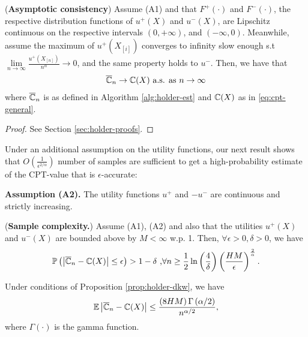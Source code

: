 \begin{proposition}(\textbf{Asymptotic consistency})
\label{prop:holder-asymptotic}
Assume (A1) and that $F^+(\cdot)$ and $F^-(\cdot)$, the respective distribution functions of $u^+(X)$ and $u^-(X)$, 
are Lipschitz continuous 
on the respective intervals $(0,+\infty)$, and 
$(-\infty, 0)$.
Meanwhile, assume the maximum of $u^+(X_{[i]})$ converges to infinity slow enough s.t 
$\lim\limits_{n\rightarrow\infty}\frac{u^+(X_{[n]})}{n^{\alpha}}\rightarrow 0$, and the same property holds to $u^-$.  Then, we have that
\begin{align}
\overline {\mathbb{C}}_n
\rightarrow
\mathbb{C}(X)
 \text{   a.s. as } n\rightarrow \infty
\end{align}
where $\overline {\mathbb{C}}_n$ is as defined in Algorithm \ref{alg:holder-est} and $\mathbb{C}(X)$ as in \eqref{eq:cpt-general}.
\end{proposition}
\begin{proof}
See Section \ref{sec:holder-proofs}. 
\end{proof}
Under an additional assumption on the utility functions,
our next result shows that $O\left(\frac{1}{\epsilon^{2/\alpha}}\right)$ number of samples are sufficient to get a
high-probability estimate of the CPT-value that is $\epsilon$-accurate:

\noindent\textbf{Assumption (A2).}  The utility functions $u^+$ and $-u^-$ are continuous and strictly increasing.


\begin{proposition}(\textbf{Sample complexity.})
\label{prop:holder-dkw}
Assume (A1), (A2) and also that the utilities $u^+(X)$ and $u^-(X)$ are bounded above by $M<\infty$ w.p. 1. Then, $\forall \epsilon >0, \delta >0$, we have
$$
\mathbb{P}\left( \left |\overline {\mathbb{C}}_n- \mathbb{C}(X) \right| \leq  \epsilon  \right) >1- \delta\text{     ,} \forall n \geq \frac{1}{2}\ln\left(\frac{4}{\delta}\right)
\left(\frac{HM}{\epsilon}\right)^{\frac{2}{\alpha}}.$$
\end{proposition}

\begin{corollary}
\label{cor:holder-dkw}
Under conditions of Proposition \ref{prop:holder-dkw}, we have
$$
\mathbb{E} \left|\overline {\mathbb{C}}_n- \mathbb{C}(X) \right|  \le    \frac{\left(8HM\right) \Gamma\left(\alpha/2\right)}{n^{\alpha/2}},$$
where $\Gamma(\cdot)$ is the gamma function.
\end{corollary}

